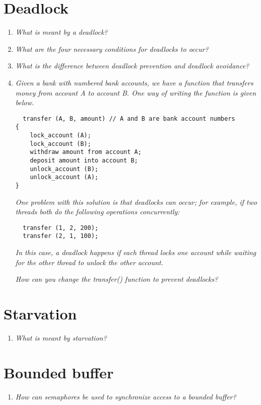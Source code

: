 \documentclass[a4paper]{article}
\begin{document}
\section{Deadlock}
\begin{enumerate}
  \item \textit{ What is meant by a deadlock? }\\
  \item \textit{ What are the four necessary conditions for deadlocks to occur? }\\
  \item  \textit{What is the difference between deadlock prevention and deadlock avoidance? }\\
  \item \textit{ Given a bank with numbered bank accounts, we have a function that transfers money from account A to account B. One way of writing the function is given below.} \\


\begin{lstlisting}
  transfer (A, B, amount) // A and B are bank account numbers
{
    lock_account (A);
    lock_account (B);
    withdraw amount from account A;
    deposit amount into account B;
    unlock_account (B);
    unlock_account (A);
}
\end{lstlisting}

\textit{One problem with this solution is that deadlocks can occur; for example, if two threads both do the following operations concurrently:}

\begin{lstlisting}
  transfer (1, 2, 200);
  transfer (2, 1, 100);
\end{lstlisting}

\textit{In this case, a deadlock happens if each thread locks one account while waiting for the other thread to unlock the other account.}

\textit{How can you change the transfer() function to prevent deadlocks?}
\end{enumerate}

\section{Starvation}
\begin{enumerate}
  \item \textit{What is meant by starvation?}
\end{enumerate}

\section{Bounded buffer}
\begin{enumerate}
  \item \textit{How can semaphores be used to synchronize access to a bounded buffer?} \\
\end{enumerate}
\end{document}
